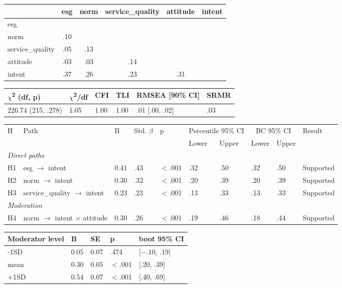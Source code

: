\documentclass{article}
\begin{document}
\begin{tabular}{lccccc}
\toprule
 & esg & norm & service\_quality & attitude & intent \\
\midrule
esg &  &  &  &  &  \\
norm & .10 &  &  &  &  \\
service\_quality & .05 & .13 &  &  &  \\
attitude & .03 & .03 & .14 &  &  \\
intent & .37 & .26 & .23 & .31 &  \\
\bottomrule
\end{tabular}

\begin{tabular}{llllll}
\toprule
$\chi$\textsuperscript{2} (df, p) & $\chi$\textsuperscript{2}/df & CFI & TLI & RMSEA [90\% CI] & SRMR \\
\midrule
226.74 (215, .278) & 1.05 & 1.00 & 1.00 & .01 [.00, .02] & .03 \\
\bottomrule
\end{tabular}

\begin{tabular}{llllllllll}
\toprule
H & Path & B & Std. $\beta$ & p & \multicolumn{2}{c}{Percentile 95\% CI} & \multicolumn{2}{c}{BC 95\% CI} & Result \\
\cmidrule(lr){6-7} \cmidrule(lr){8-9}
 &  &  &  &  & Lower & Upper & Lower & Upper &  \\
\midrule
\multicolumn{10}{l}{\textit{Direct paths}} \\
H1 & esg $\rightarrow$ intent & 0.41 & .43 & $<$.001 & .32 & .50 & .32 & .50 & Supported \\
H2 & norm $\rightarrow$ intent & 0.30 & .32 & $<$.001 & .20 & .39 & .20 & .39 & Supported \\
H3 & service\_quality $\rightarrow$ intent & 0.23 & .23 & $<$.001 & .13 & .33 & .13 & .33 & Supported \\
\multicolumn{10}{l}{\textit{Moderation}} \\
H4 & norm $\rightarrow$ intent $\times$ attitude & 0.30 & .26 & $<$.001 & .19 & .46 & .18 & .44 & Supported \\
\bottomrule
\end{tabular}

\begin{tabular}{lllll}
\toprule
Moderator level & B & SE & p & boot 95\% CI \\
\midrule
-1SD & 0.05 & 0.07 & .474 & [$-$.10, .19] \\
mean & 0.30 & 0.05 & $<$.001 & [.20, .39] \\
+1SD & 0.54 & 0.07 & $<$.001 & [.40, .69] \\
\bottomrule
\end{tabular}
\end{document}
